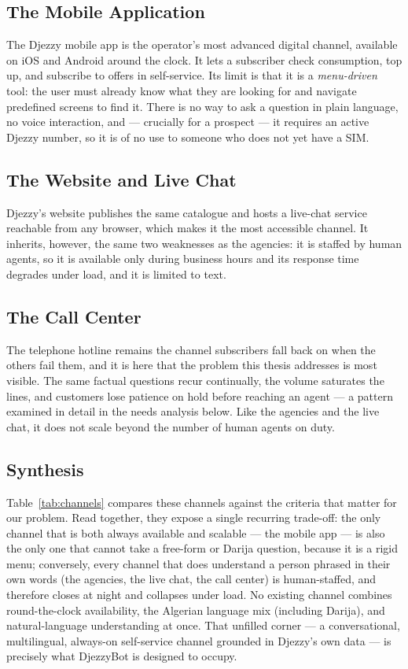 \documentclass[12pt, a4paper]{report}
\newcommand{\humantext}[1]{#1}      %
\begin{document}
\subsection{The Mobile Application}
\humantext{The Djezzy mobile app is the operator's most advanced digital channel, available on iOS and Android around the clock. It lets a subscriber check consumption, top up, and subscribe to offers in self-service. Its limit is that it is a \emph{menu-driven} tool: the user must already know what they are looking for and navigate predefined screens to find it. There is no way to ask a question in plain language, no voice interaction, and --- crucially for a prospect --- it requires an active Djezzy number, so it is of no use to someone who does not yet have a SIM.}

\subsection{The Website and Live Chat}
\humantext{Djezzy's website publishes the same catalogue and hosts a live-chat service reachable from any browser, which makes it the most accessible channel. It inherits, however, the same two weaknesses as the agencies: it is staffed by human agents, so it is available only during business hours and its response time degrades under load, and it is limited to text.}

\subsection{The Call Center}
\humantext{The telephone hotline remains the channel subscribers fall back on when the others fail them, and it is here that the problem this thesis addresses is most visible. The same factual questions recur continually, the volume saturates the lines, and customers lose patience on hold before reaching an agent --- a pattern examined in detail in the needs analysis below. Like the agencies and the live chat, it does not scale beyond the number of human agents on duty.}

\subsection{Synthesis}
\humantext{Table~\ref{tab:channels} compares these channels against the criteria that matter for our problem. Read together, they expose a single recurring trade-off: the only channel that is both always available and scalable --- the mobile app --- is also the only one that cannot take a free-form or Darija question, because it is a rigid menu; conversely, every channel that does understand a person phrased in their own words (the agencies, the live chat, the call center) is human-staffed, and therefore closes at night and collapses under load. No existing channel combines round-the-clock availability, the Algerian language mix (including Darija), and natural-language understanding at once. That unfilled corner --- a conversational, multilingual, always-on self-service channel grounded in Djezzy's own data --- is precisely what DjezzyBot is designed to occupy.}
\end{document}
